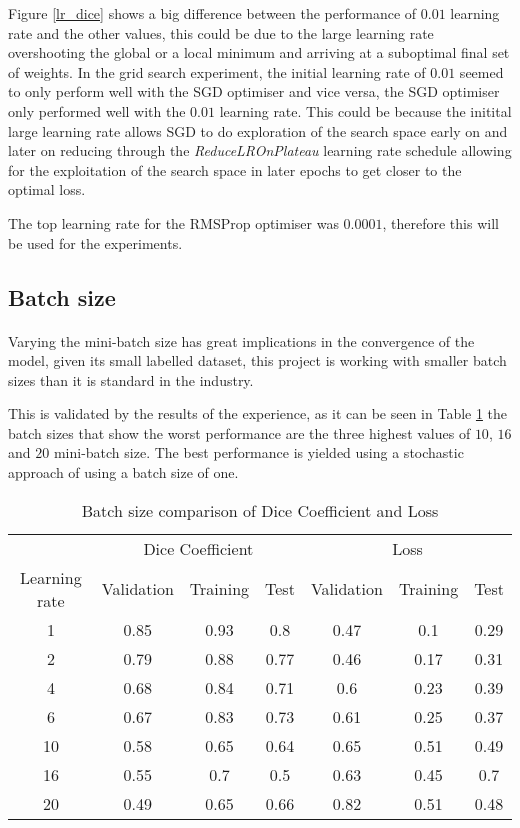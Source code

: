 Figure \ref{lr_dice} shows a big difference between the performance of $0.01$ learning rate and the other values, this could be due to the large learning rate overshooting the global or a local minimum and arriving at a suboptimal final set of weights.
In the grid search experiment, the initial learning rate of $0.01$ seemed to only perform well with the \gls{SGD} optimiser and vice versa, the \gls{SGD} optimiser only performed well with the $0.01$ learning rate. This could be because the initital large learning rate allows SGD to do exploration of the search space early on and later on reducing through the \textit{ReduceLROnPlateau} learning rate schedule allowing for the exploitation of the search space in later epochs to get closer to the optimal loss.

The top learning rate for the RMSProp optimiser was $0.0001$, therefore this will be used for the experiments.

\subsection{Batch size}
\paragraph{}
Varying the mini-batch size has great implications in the convergence of the model, given its small labelled dataset, this project is working with smaller batch sizes than it is standard in the industry.

This is validated by the results of the experience, as it can be seen in Table \ref{tab_batch} the batch sizes that show the worst performance are the three highest values of $10$, $16$ and $20$ mini-batch size. The best performance is yielded using a stochastic approach of using a batch size of one.

\begin{table}[ht!] 
    \begin{center}
    \begin{tabular}{ccccccc} 
    \toprule
       & \multicolumn{3}{c}{Dice Coefficient}     & \multicolumn{3}{c}{Loss} \\
    Learning rate & Validation & Training & Test & Validation & Training & Test \\ \midrule
    \rowcolor{lightgray} 1 & 0.85 & 0.93 & 0.8 & 0.47 & 0.1 & 0.29  \\ 2 & 0.79 & 0.88 & 0.77 & 0.46 & 0.17 & 0.31  \\ 4 & 0.68 & 0.84 & 0.71 & 0.6 & 0.23 & 0.39  \\ 6 & 0.67 & 0.83 & 0.73 & 0.61 & 0.25 & 0.37  \\ 10 & 0.58 & 0.65 & 0.64 & 0.65 & 0.51 & 0.49  \\ 16 & 0.55 & 0.7 & 0.5 & 0.63 & 0.45 & 0.7  \\ 20 & 0.49 & 0.65 & 0.66 & 0.82 & 0.51 & 0.48  \\
    \bottomrule
    \end{tabular}
  \end{center} 
  \caption{Batch size comparison of Dice Coefficient and Loss}\label{tab_batch}
\end{table}

